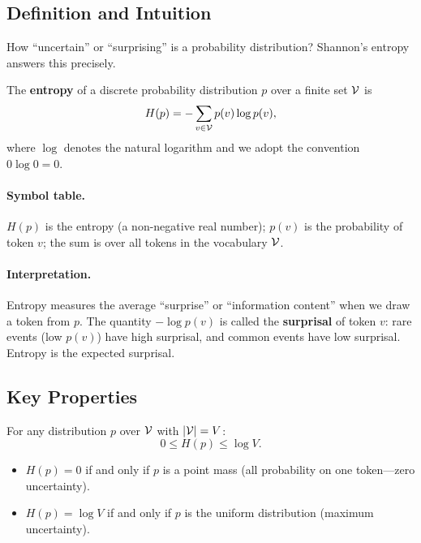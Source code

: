 \subsection{Definition and Intuition}

How ``uncertain'' or ``surprising'' is a probability distribution? Shannon's entropy answers this precisely.

\begin{definition}[Entropy]
\label{def:01:entropy}
The \textbf{entropy} of a discrete probability distribution $p$ over a finite set $\mathcal{V}$ is
\begin{equation}
\label{eq:01:entropy}
H(p) = -\sum_{v \in \mathcal{V}} p(v) \log p(v),
\end{equation}
where $\log$ denotes the natural logarithm and we adopt the convention $0 \log 0 = 0$.
\end{definition}

\paragraph{Symbol table.} $H(p)$ is the entropy (a non-negative real number); $p(v)$ is the probability of token $v$; the sum is over all tokens in the vocabulary $\mathcal{V}$.

\paragraph{Interpretation.} Entropy measures the average ``surprise'' or ``information content'' when we draw a token from $p$. The quantity $-\log p(v)$ is called the \textbf{surprisal} of token $v$: rare events (low $p(v)$) have high surprisal, and common events have low surprisal. Entropy is the expected surprisal.

\subsection{Key Properties}

\begin{proposition}
\label{prop:01:entropy_bounds}
For any distribution $p$ over $\mathcal{V}$ with $|\mathcal{V}| = V$:
\begin{equation}
0 \leq H(p) \leq \log V.
\end{equation}
\begin{itemize}
  \item $H(p) = 0$ if and only if $p$ is a point mass (all probability on one token---zero uncertainty).
  \item $H(p) = \log V$ if and only if $p$ is the uniform distribution (maximum uncertainty).
\end{itemize}
\end{proposition}


